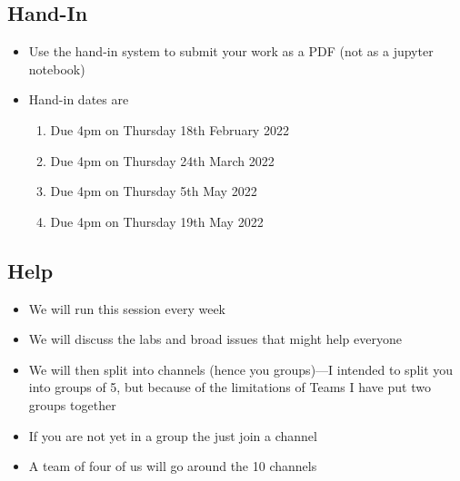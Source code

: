 \begin{slide}
  \section{Hand-In}
  
\begin{PauseHighLight}
  \begin{itemize}
  \item Use the hand-in system to submit your work as a PDF (not as a
    jupyter notebook)\pause
  \item Hand-in dates are
    \begin{enumerate}
    \item Due 4pm on Thursday 18th February 2022\pause
    \item Due 4pm on Thursday 24th March 2022
    \item Due 4pm on Thursday 5th May 2022
    \item Due 4pm on Thursday 19th May 2022\pause
    \end{enumerate}
  \end{itemize}
\end{PauseHighLight}

\end{slide}


\begin{slide}
\section{Help}

\begin{PauseHighLight}
  \begin{itemize}
  \item We will run this session every week\pause
  \item We will discuss the labs and broad issues that might help
    everyone\pause
  \item We will then split into channels (hence you groups)---I
    intended to split you into groups of 5, but because of the limitations
    of Teams I have put two groups together\pause
  \item If you are not yet in a group the just join a channel\pause
  \item A team of four of us will go around the 10 channels\pause
  \end{itemize}
\end{PauseHighLight}

\end{slide}

